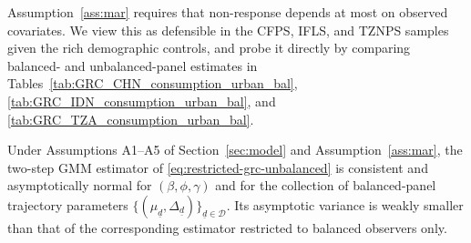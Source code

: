 Assumption~\ref{ass:mar} requires that non-response depends at most
on observed covariates. We view this as defensible in the CFPS, IFLS,
and TZNPS samples given the rich demographic controls, and probe it
directly by comparing balanced- and unbalanced-panel estimates in
Tables~\ref{tab:GRC_CHN_consumption_urban_bal},
\ref{tab:GRC_IDN_consumption_urban_bal}, and
\ref{tab:GRC_TZA_consumption_urban_bal}.

\begin{proposition}
\label{prop:pooling}
Under Assumptions A1--A5 of Section~\ref{sec:model} and
Assumption~\ref{ass:mar}, the two-step GMM estimator of
\eqref{eq:restricted-grc-unbalanced} is consistent and asymptotically
normal for $(\beta,\phi,\gamma)$ and for the collection of
balanced-panel trajectory parameters $\{(\mu_{\underline d},
\Delta_{\underline d})\}_{\underline d\in\mathcal{D}}$.
Its asymptotic variance is weakly smaller than that of the
corresponding estimator restricted to balanced observers only.
\end{proposition}

